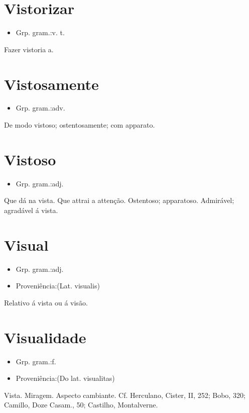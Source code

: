 \documentclass{article}
\begin{document}
\section{Vistorizar}
\begin{itemize}
\item {Grp. gram.:v. t.}
\end{itemize}
Fazer vistoria a.
\section{Vistosamente}
\begin{itemize}
\item {Grp. gram.:adv.}
\end{itemize}
De modo vistoso; ostentosamente; com apparato.
\section{Vistoso}
\begin{itemize}
\item {Grp. gram.:adj.}
\end{itemize}
Que dá na vista.
Que attrai a attenção.
Ostentoso; apparatoso.
Admirável; agradável á vista.
\section{Visual}
\begin{itemize}
\item {Grp. gram.:adj.}
\end{itemize}
\begin{itemize}
\item {Proveniência:(Lat. \textunderscore visualis\textunderscore )}
\end{itemize}
Relativo á vista ou á visão.
\section{Visualidade}
\begin{itemize}
\item {Grp. gram.:f.}
\end{itemize}
\begin{itemize}
\item {Proveniência:(Do lat. \textunderscore visualitas\textunderscore )}
\end{itemize}
Vista.
Miragem.
Aspecto cambiante. Cf. Herculano, \textunderscore Cister\textunderscore , II, 252; \textunderscore Bobo\textunderscore , 320; Camillo, \textunderscore Doze Casam.\textunderscore , 50; Castilho, \textunderscore Montalverne\textunderscore .
\end{document}

